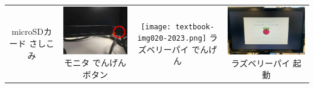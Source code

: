 \documentclass[dvipdfmx]{beamer}
\begin{document}
\begin{frame}[fragile]
\begin{tabular}{cccc}
\begin{minipage}{0.23\textwidth}
{                      microSDカード さしこみ}
		 \end{minipage}&
		 \begin{minipage}{0.23\textwidth}
                    {\upshape
                      \includegraphics[width=1\textwidth]{textbook-img019.png}
                      \newline
                      モニタ でんげんボタン}
		 \end{minipage}&
		 \begin{minipage}{0.23\textwidth}
            {\upshape
              \texttt{[image: textbook-img020-2023.png]}
              \newline
              ラズベリーパイ でんげん}
		 \end{minipage}&
		 \begin{minipage}{0.23\textwidth}
            {\upshape
              \includegraphics[width=\textwidth]{textbook-img0212023.png}
              \newline
              ラズベリーパイ 起動}
            \end{minipage} \\



	\end{tabular}


\end{frame}
\end{document}
